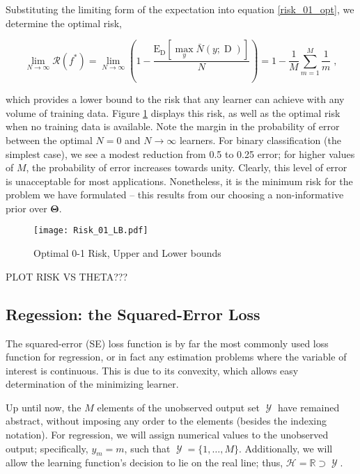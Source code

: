 \documentclass[12pt]{report}
\DeclareMathOperator{\Drm}{\mathrm{D}}
\DeclareMathOperator{\Ycal}{\mathcal{Y}}
\begin{document}
Substituting the limiting form of the expectation into equation \eqref{risk_01_opt}, we determine the optimal risk,

\begin{equation}
\lim_{N \to \infty} \mathcal{R}(f^*)  = \lim_{N \to \infty} \left( 1 - \frac{\text{E}_{\Drm} \left[ \max_y \bar{N}(y;\Drm) \right]}{N} \right) = 1 - \frac{1}{M} \sum_{m=1}^M \frac{1}{m} \;,
\end{equation}

which provides a lower bound to the risk that any learner can achieve with any volume of training data. Figure \ref{fig:Risk_01_LB} displays this risk, as well as the optimal risk when no training data is available. Note the margin in the probability of error between the optimal $N=0$ and $N \to \infty$ learners. For binary classification (the simplest case), we see a modest reduction from 0.5 to 0.25 error; for higher values of $M$, the probability of error increases towards unity. Clearly, this level of error is unacceptable for most applications. Nonetheless, it is the minimum risk for the problem we have formulated -- this results from our choosing a non-informative prior over $\bm{\Theta}$.


\begin{figure}
\centering
\texttt{[image: Risk\_01\_LB.pdf]}
\caption{Optimal 0-1 Risk, Upper and Lower bounds}
\label{fig:Risk_01_LB}
\end{figure}

PLOT RISK VS THETA???


\subsection{Regession: the Squared-Error Loss}

The squared-error (SE) loss function is by far the most commonly used loss function for regression, or in fact any estimation problems where the variable of interest is continuous. This is due to its convexity, which allows easy determination of the minimizing learner. 

Up until now, the $M$ elements of the unobserved output set $\Ycal$ have remained abstract, without imposing any order to the elements (besides the indexing notation). For regression, we will assign numerical values to the unobserved output; specifically, $y_m = m$, such that $\Ycal = \{1,\ldots,M\}$. Additionally, we will allow the learning function's decision to lie on the real line; thus, $\mathcal{H} = \mathbb{R} \supset \Ycal$.
\end{document}

